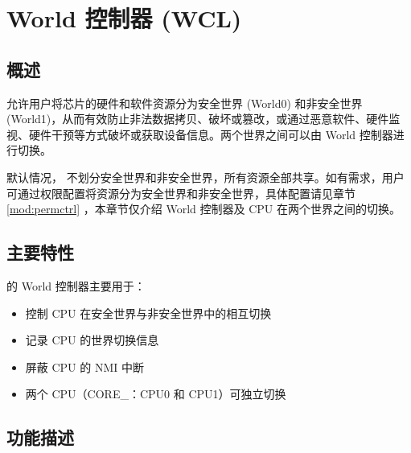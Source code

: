 \documentclass[main\_\_CN.tex]{subfiles}
\begin{document}

\ifglobal
\else
    {\let\clearpage\relax \listoftodos}
    \tableofcontents
\fi



\hypertarget{wctrl}{}
\chapter{World 控制器 (WCL)}\label{mod:wctrl}

\section{概述}

\chipname{} 允许用户将芯片的硬件和软件资源分为安全世界 (World0) 和非安全世界 (World1)，从而有效防止非法数据拷贝、破坏或篡改，或通过恶意软件、硬件监视、硬件干预等方式破坏或获取设备信息。两个世界之间可以由 World 控制器进行切换。

默认情况，\chipname{} 不划分安全世界和非安全世界，所有资源全部共享。如有需求，用户可通过权限配置将资源分为安全世界和非安全世界，具体配置请见章节 \ref{mod:permctrl} \textit{}，本章节仅介绍 World 控制器及 CPU 在两个世界之间的切换。

\section{主要特性}
\label{sec:alias-features}

\chipname{} 的 World 控制器主要用于：
\begin{itemize}
    \item 控制 CPU 在安全世界与非安全世界中的相互切换
    \item 记录 CPU 的世界切换信息
    \item 屏蔽 CPU 的 NMI 中断
    \item 两个 CPU（CORE\_：CPU0 和 CPU1）可独立切换
\end{itemize}

\section{功能描述}
\label{sec:38-WCTRL-func-descr}
\end{document}
